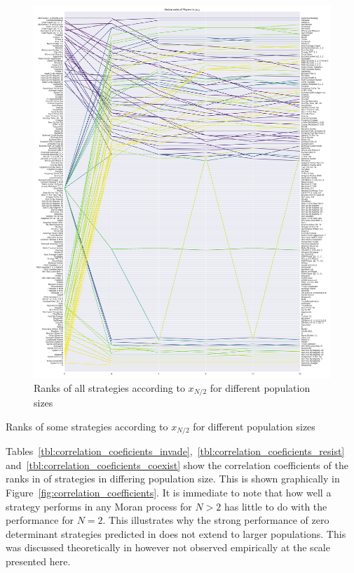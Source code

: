 \documentclass{article}
\begin{document}
\begin{figure}[!hbtp]
    \centering
    \includegraphics[height=.9\textheight]{./img/median_rank_vs_population_size_coexist.pdf}
    \caption{Ranks of all strategies according to \(x_{N/2}\) for different
    population sizes}
    \label{fig:ranks_v_size_coexist}
\end{figure}

\begin{table}[!hbtp]
    \centering
    \scriptsize
    
    \caption{Ranks of some strategies according to \(x_{N/2}\) for different
    population sizes}
    \label{tbl:ranks_v_size_coexist}
\end{table}

Tables~\ref{tbl:correlation_coeficients_invade},~\ref{tbl:correlation_coeficients_resist}
and~\ref{tbl:correlation_coeficients_coexist} show the correlation coefficients
of the ranks in of strategies in differing population size. This is shown
graphically in Figure~\ref{fig:correlation_coefficients}. It is immediate to
note that how well a strategy performs in any Moran process for \(N>2\) has
little to do with the performance for \(N=2\). This illustrates why the strong
performance of zero determinant strategies predicted in \cite{Press2012} does
not extend to larger populations. This was discussed theoretically in
\cite{Adami2013} however not observed empirically at the scale presented here.
\end{document}
